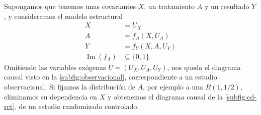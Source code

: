 \begin{ejemplo}\cite[sección 1.2]{mci}
    Supongamos que tenemos unas covariantes $X$, un tratamiento $A$ y un resultado $Y$, y
    consideramos el modelo estructural
    \begin{align*}
        X                      & = U_X              \\
        A                      & = f_A(X, U_A)      \\
        Y                      & = f_Y(X, A, U_Y)   \\
        \operatorname{Im}(f_A) & \subseteq \{0, 1\}
    \end{align*}
    Omitiendo las variables exógenas $U = \left(U_X, U_A, U_Y\right)$, nos queda el diagrama causal
    visto en la \autoref{subfig:observacional}, correspondiente a un estudio observacional.
    Si fijamos la distribución de $A$, por ejemplo a una $B(1, 1/2)$, eliminamos
    su dependencia en $X$ y obtenemos el diagrama causal de la \autoref{subfig:cd-rct},
    de un estudio randomizado controlado.
\end{ejemplo}
